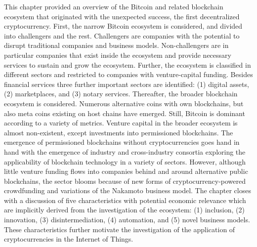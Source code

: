 This chapter provided an overview of the Bitcoin and related blockchain ecosystem that originated with the unexpected success, the first decentralized cryptocurrency. First, the narrow Bitcoin ecosystem is considered, and divided into challengers and the rest. Challengers are companies with the potential to disrupt traditional companies and business models. Non-challengers are in particular companies that exist inside the ecosystem and provide necessary services to sustain and grow the ecosystem. Further, the ecosystem is classified in different sectors and restricted to companies with venture-capital funding. Besides financial services three further important sectors are identified: (1) digital assets, (2) marketplaces, and (3) notary services. Thereafter, the broader blockchain ecosystem is considered. Numerous alternative coins with own blockchains, but also meta coins existing on host chains have emerged. Still, Bitcoin is dominant according to a variety of metrics. Venture capital in the broader ecosystem is almost non-existent, except investments into permissioned blockchains. The emergence of permissioned blockchains without cryptocurrencies goes hand in hand with the emergence of industry and cross-industry consortia exploring the applicability of blockchain technology in a variety of sectors. However, although little venture funding flows into companies behind and around alternative public blockchains, the sector blooms because of new forms of cryptocurrency-powered crowdfunding and variations of the Nakamoto business model. The chapter closes with a discussion of five characteristics with potential economic relevance which are implicitly derived from the investigation of the ecosystem: (1) inclusion, (2) innovation, (3) disintermediation, (4) automation, and (5) novel business models. These characteristics further motivate the investigation of the application of cryptocurrencies in the Internet of Things. 
